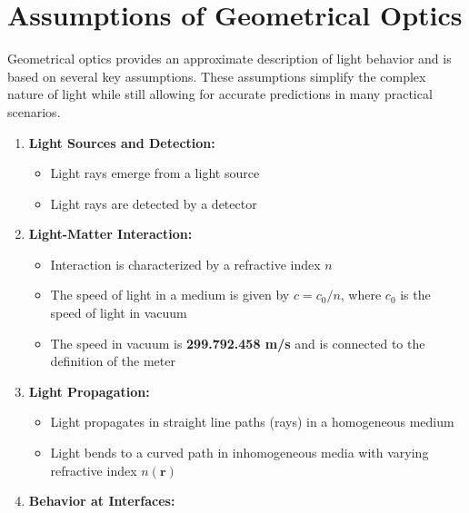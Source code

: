\documentclass[
  a4paper,
]{book}
\providecommand{\tightlist}{%
  \setlength{\itemsep}{0pt}\setlength{\parskip}{0pt}}
\begin{document}
\section{Assumptions of Geometrical
Optics}\label{assumptions-of-geometrical-optics}

Geometrical optics provides an approximate description of light behavior
and is based on several key assumptions. These assumptions simplify the
complex nature of light while still allowing for accurate predictions in
many practical scenarios.

\begin{tcolorbox}[enhanced jigsaw, breakable, toptitle=1mm, bottomrule=.15mm, colbacktitle=quarto-callout-note-color!10!white, title=\textcolor{quarto-callout-note-color}{\faInfo}\hspace{0.5em}{Core Assumptions}, arc=.35mm, rightrule=.15mm, bottomtitle=1mm, opacityback=0, toprule=.15mm, coltitle=black, leftrule=.75mm, opacitybacktitle=0.6, colback=white, left=2mm, titlerule=0mm, colframe=quarto-callout-note-color-frame]

\begin{enumerate}
\def\labelenumi{\arabic{enumi}.}
\tightlist
\item
  \textbf{Light Sources and Detection:}

  \begin{itemize}
  \tightlist
  \item
    Light rays emerge from a light source
  \item
    Light rays are detected by a detector
  \end{itemize}
\item
  \textbf{Light-Matter Interaction:}

  \begin{itemize}
  \tightlist
  \item
    Interaction is characterized by a refractive index \(n\)
  \item
    The speed of light in a medium is given by \(c=c_0/n\), where
    \(c_0\) is the speed of light in vacuum
  \item
    The speed in vacuum is \textbf{299.792.458 m/s} and is connected to
    the definition of the meter
  \end{itemize}
\item
  \textbf{Light Propagation:}

  \begin{itemize}
  \tightlist
  \item
    Light propagates in straight line paths (rays) in a homogeneous
    medium
  \item
    Light bends to a curved path in inhomogeneous media with varying
    refractive index \(n(\textbf{r})\)
  \end{itemize}
\item
  \textbf{Behavior at Interfaces:}


\end{enumerate}
\end{tcolorbox}
\end{document}
